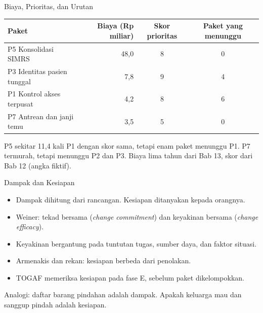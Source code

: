 \documentclass[aspectratio=169, table, 12pt]{beamer}
\begin{document}
\begin{frame}{{\Large Biaya, Prioritas, dan Urutan}}
  \footnotesize
  \begin{tabularx}{\textwidth}{>{\raggedright\arraybackslash}Xrcc}
    \hline
    \textbf{Paket} & \textbf{Biaya (Rp miliar)} & \textbf{Skor prioritas} & \textbf{Paket yang menunggu} \\ \hline
    P5 Konsolidasi SIMRS & 48,0 & 8 & 0 \\ \hline
    P3 Identitas pasien tunggal & 7,8 & 9 & 4 \\ \hline
    P1 Kontrol akses terpusat & 4,2 & 8 & 6 \\ \hline
    P7 Antrean dan janji temu & 3,5 & 5 & 0 \\ \hline
  \end{tabularx}

  \vspace{8pt}
  \small P5 sekitar 11,4 kali P1 dengan skor sama, tetapi enam paket menunggu P1. P7 termurah, tetapi menunggu P2 dan P3.
  Biaya lima tahun dari Bab 13, skor dari Bab 12 (angka fiktif).
\end{frame}

\begin{frame}{{\Large Dampak dan Kesiapan}}
  \vspace{10pt}
  \begin{itemize}
    \item Dampak dihitung dari rancangan. Kesiapan ditanyakan kepada orangnya.
    \item Weiner: tekad bersama (\textit{change commitment}) dan keyakinan bersama (\textit{change efficacy}).
    \item Keyakinan bergantung pada tuntutan tugas, sumber daya, dan faktor situasi.
    \item Armenakis dan rekan: kesiapan berbeda dari penolakan.
    \item TOGAF memeriksa kesiapan pada fase E, sebelum paket dikelompokkan.
  \end{itemize}
  \vspace{6pt}
  {\small Analogi: daftar barang pindahan adalah dampak. Apakah keluarga mau dan sanggup pindah adalah kesiapan.}
\end{frame}
\end{document}
